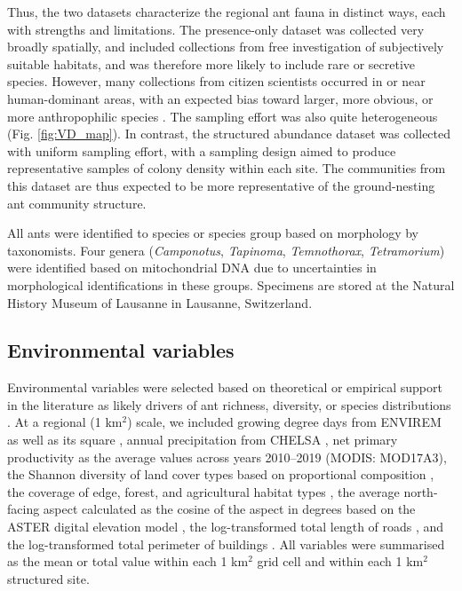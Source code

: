 \documentclass[preprint,review,times,12pt,3p]{elsarticle}
\begin{document}
Thus, the two datasets characterize the regional ant fauna in distinct ways, each with strengths and limitations. The presence-only dataset was collected very broadly spatially, and included collections from free investigation of subjectively suitable habitats, and was therefore more likely to include rare or secretive species. However, many collections from citizen scientists occurred in or near human-dominant areas, with an expected bias toward larger, more obvious, or more anthropophilic species \citep{Ward2014, Troudet2017}. The sampling effort was also quite heterogeneous (Fig. \ref{fig:VD_map}). In contrast, the structured abundance dataset was collected with uniform sampling effort, with a sampling design aimed to produce representative samples of colony density within each site. The communities from this dataset are thus expected to be more representative of the ground-nesting ant community structure. 

All ants were identified to species or species group based on morphology by taxonomists. Four genera (\emph{Camponotus}, \emph{Tapinoma}, \emph{Temnothorax}, \emph{Tetramorium}) were identified based on mitochondrial DNA due to uncertainties in morphological identifications in these groups. Specimens are stored at the Natural History Museum of Lausanne in Lausanne, Switzerland. 


\subsection{Environmental variables}
Environmental variables were selected based on theoretical or empirical support in the literature as likely drivers of ant richness, diversity, or species distributions \citep{Bishop2017,Liu2018,Szewczyk2018,Longino2019,Uhey2020}. At a regional (1 km$^2$) scale, we included growing degree days from ENVIREM as well as its square \citep{Title2018}, annual precipitation from CHELSA \citep{Karger2017}, net primary productivity as the average values across years 2010–2019 (MODIS: MOD17A3), the Shannon diversity of land cover types based on proportional composition \citep{Gago-Silva2017}, the coverage of edge, forest, and agricultural habitat types \citep{Gago-Silva2017}, the average north-facing aspect calculated as the cosine of the aspect in degrees based on the ASTER digital elevation model \citep{Tachikawa2011}, the log-transformed total length of roads \citep{OpenStreetMap}, and the log-transformed total perimeter of buildings \citep{OpenStreetMap}. All variables were summarised as the mean or total value within each 1 km$^2$ grid cell and within each 1 km$^2$ structured site.
\end{document}
